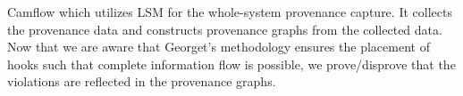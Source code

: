 

\label{Camflow}
Camflow which utilizes LSM for the whole-system provenance capture. It collects the provenance data and constructs provenance graphs from the collected data. Now that we are aware that Georget's methodology ensures the placement of hooks such that complete information flow is possible, we prove/disprove that the violations are reflected in the provenance graphs.

